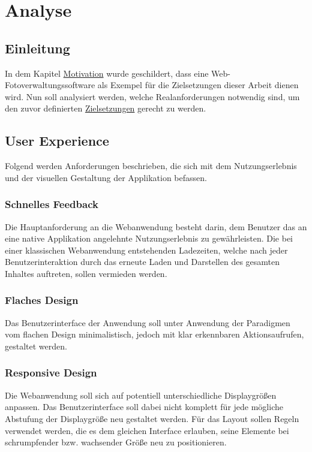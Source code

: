 \chapter{Analyse}
\label{sec:analysis}

\section{Einleitung}

In dem Kapitel \hyperref[sec:motivation]{Motivation} wurde geschildert, dass eine Web-Fotoverwaltungssoftware als Exempel für die Zielsetzungen dieser Arbeit dienen wird. Nun soll analysiert werden, welche Realanforderungen notwendig sind, um den zuvor definierten \hyperref[sec:zielsetzung]{Zielsetzungen} gerecht zu werden.

\section{User Experience}

Folgend werden Anforderungen beschrieben, die sich mit dem Nutzungserlebnis und der visuellen Gestaltung der Applikation befassen.

\subsection{Schnelles Feedback}

Die Hauptanforderung an die Webanwendung besteht darin, dem Benutzer das an eine native Applikation angelehnte Nutzungserlebnis zu gewährleisten. Die bei einer
klassischen Webanwendung entstehenden Ladezeiten, welche nach jeder Benutzerinteraktion durch das erneute Laden und Darstellen des gesamten Inhaltes
auftreten, sollen vermieden werden.

\subsection{Flaches Design}

Das Benutzerinterface der Anwendung soll unter Anwendung der Paradigmen vom flachen Design minimalistisch, jedoch mit klar erkennbaren Aktionsaufrufen, gestaltet werden.

\subsection{Responsive Design}

Die Webanwendung soll sich auf potentiell unterschiedliche Displaygrößen anpassen. Das Benutzerinterface soll dabei nicht komplett für jede mögliche Abstufung der Displaygröße neu gestaltet werden. Für das Layout sollen Regeln verwendet werden, die es dem gleichen Interface erlauben, seine Elemente bei schrumpfender bzw. wachsender Größe neu zu positionieren.

